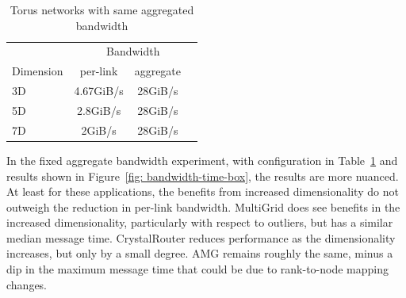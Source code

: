 \begin{table}[ht]
\begin{center}
\caption{Torus networks with same aggregated bandwidth} 
\label{tab: fix-bandwidth}
\begin{tabular}{l c c c} 
\toprule %
\toprule
&\multicolumn{3}{c}{Bandwidth } \\
\cmidrule(l){2-4}
Dimension  & per-link & aggregate &\\ %
\midrule %
3D      & 4.67GiB/s  & 28GiB/s  & \\  %
\midrule %
5D    & 2.8GiB/s  & 28GiB/s  &\\ %
\midrule %
7D    & 2GiB/s & 28GiB/s & \\
\midrule
\bottomrule %
\end{tabular}
\end{center}
\end{table}

In the fixed aggregate bandwidth experiment, with configuration in Table~\ref{tab: fix-bandwidth} and results shown in Figure~\ref{fig: bandwidth-time-box}, the results are more nuanced. At least for these applications, the benefits from increased dimensionality do not outweigh the reduction in per-link bandwidth. MultiGrid does see benefits in the increased dimensionality, particularly with respect to outliers, but has a similar median message time. CrystalRouter reduces performance as the dimensionality increases, but only by a small degree. AMG remains roughly the same, minus a dip in the maximum message time that could be due to rank-to-node mapping changes.



